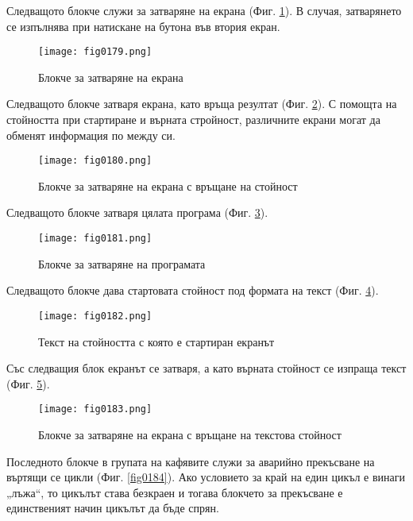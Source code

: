 Следващото блокче служи за затваряне на екрана (Фиг. \ref{fig0179}). В случая, затварянето се изпълнява при натискане на бутона във втория екран. 

\begin{figure}[H]
  \centering
  \texttt{[image: fig0179.png]}
  \caption{Блокче за затваряне на екрана}
\label{fig0179}
\end{figure}

Следващото блокче затваря екрана, като връща резултат (Фиг. \ref{fig0180}). С помощта на стойността при стартиране и върната стройност, различните екрани могат да обменят информация по между си. 

\begin{figure}[H]
  \centering
  \texttt{[image: fig0180.png]}
  \caption{Блокче за затваряне на екрана с връщане на стойност}
\label{fig0180}
\end{figure}

Следващото блокче затваря цялата програма (Фиг. \ref{fig0181}).

\begin{figure}[H]
  \centering
  \texttt{[image: fig0181.png]}
  \caption{Блокче за затваряне на програмата}
\label{fig0181}
\end{figure}

Следващото блокче дава стартовата стойност под формата на текст (Фиг. \ref{fig0182}).

\begin{figure}[H]
  \centering
  \texttt{[image: fig0182.png]}
  \caption{Текст на стойността с която е стартиран екранът}
\label{fig0182}
\end{figure}

Със следващия блок екранът се затваря, а като върната стойност се изпраща текст (Фиг. \ref{fig0183}).

\begin{figure}[H]
  \centering
  \texttt{[image: fig0183.png]}
  \caption{Блокче за затваряне на екрана с връщане на текстова стойност}
\label{fig0183}
\end{figure}

Последното блокче в групата на кафявите служи за аварийно прекъсване на въртящи се цикли (Фиг. \ref{fig0184}). Ако условието за край на един цикъл е винаги „лъжа“, то цикълът става безкраен и тогава блокчето за прекъсване е единственият начин цикълът да бъде спрян.

